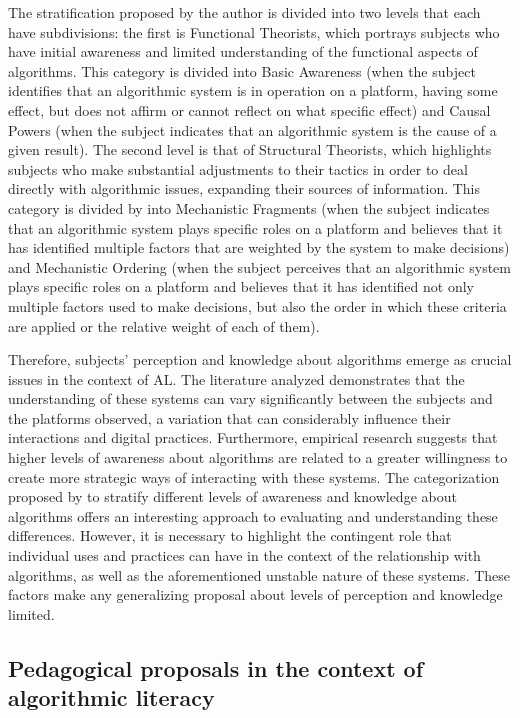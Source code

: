 The stratification proposed by the author is divided into two levels that each have subdivisions: the first is Functional Theorists, which portrays subjects who have initial awareness and limited understanding of the functional aspects of algorithms. This category is divided into Basic Awareness (when the subject identifies that an algorithmic system is in operation on a platform, having some effect, but does not affirm or cannot reflect on what specific effect) and Causal Powers (when the subject indicates that an algorithmic system is the cause of a given result). The second level is that of Structural Theorists, which highlights subjects who make substantial adjustments to their tactics in order to deal directly with algorithmic issues, expanding their sources of information. This category is divided by \textcite{Devito2021} into Mechanistic Fragments (when the subject indicates that an algorithmic system plays specific roles on a platform and believes that it has identified multiple factors that are weighted by the system to make decisions) and Mechanistic Ordering (when the subject perceives that an algorithmic system plays specific roles on a platform and believes that it has identified not only multiple factors used to make decisions, but also the order in which these criteria are applied or the relative weight of each of them).

Therefore, subjects' perception and knowledge about algorithms emerge as crucial issues in the context of AL. The literature analyzed demonstrates that the understanding of these systems can vary significantly between the subjects and the platforms observed, a variation that can considerably influence their interactions and digital practices. Furthermore, empirical research suggests that higher levels of awareness about algorithms are related to a greater willingness to create more strategic ways of interacting with these systems. The categorization proposed by \textcite{Devito2021} to stratify different levels of awareness and knowledge about algorithms offers an interesting approach to evaluating and understanding these differences. However, it is necessary to highlight the contingent role that individual uses and practices can have in the context of the relationship with algorithms, as well as the aforementioned unstable nature of these systems. These factors make any generalizing proposal about levels of perception and knowledge limited.

\subsection{Pedagogical proposals in the context of algorithmic literacy}\label{sub-sec-aspropostaspedagogicas}

